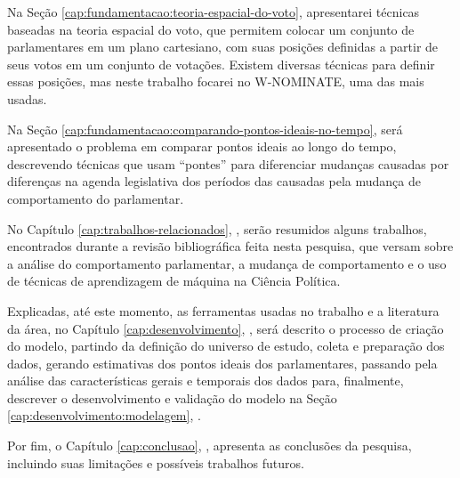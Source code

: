Na Seção \ref{cap:fundamentacao:teoria-espacial-do-voto}, apresentarei técnicas
baseadas na teoria espacial do voto, que permitem colocar um conjunto de
parlamentares em um plano cartesiano, com suas posições definidas a partir de
seus votos em um conjunto de votações. Existem diversas técnicas para definir
essas posições, mas neste trabalho focarei no W-NOMINATE, uma das mais usadas.

Na Seção \ref{cap:fundamentacao:comparando-pontos-ideais-no-tempo}, será
apresentado o problema em comparar pontos ideais ao longo do tempo, descrevendo
técnicas que usam ``pontes'' para diferenciar mudanças causadas por diferenças
na agenda legislativa dos períodos das causadas pela mudança de comportamento
do parlamentar.

No Capítulo \ref{cap:trabalhos-relacionados},
, serão resumidos alguns trabalhos,
encontrados durante a revisão bibliográfica feita nesta pesquisa, que versam
sobre a análise do comportamento parlamentar, a mudança de comportamento e o
uso de técnicas de aprendizagem de máquina na Ciência Política.

Explicadas, até este momento, as ferramentas usadas no trabalho e a literatura
da área, no Capítulo \ref{cap:desenvolvimento}, ,
será descrito o processo de criação do modelo, partindo da definição do
universo de estudo, coleta e preparação dos dados, gerando estimativas dos
pontos ideais dos parlamentares, passando pela análise das características
gerais e temporais dos dados para, finalmente, descrever o desenvolvimento e
validação do modelo na Seção \ref{cap:desenvolvimento:modelagem},
.

Por fim, o Capítulo \ref{cap:conclusao}, , apresenta as
conclusões da pesquisa, incluindo suas limitações e possíveis trabalhos futuros.
